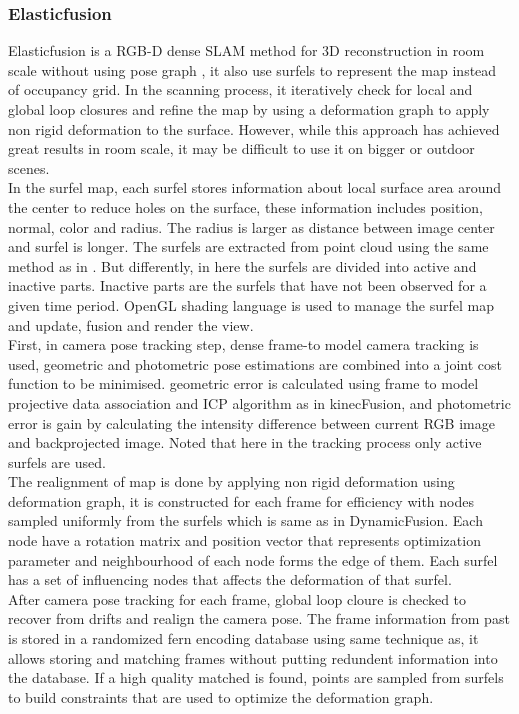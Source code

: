 \documentclass[12pt,twoside]{article}
\begin{document}
\subsubsection{Elasticfusion}
Elasticfusion\cite{whelan2015elasticfusion} is a RGB-D dense SLAM method for 3D reconstruction in room scale without using pose graph , it also use surfels to represent the map instead of occupancy grid. In the scanning process, it iteratively check for local and global loop closures and refine the map by using a deformation graph to apply non rigid deformation to the surface. However, while this approach has achieved great results in room scale, it may be difficult to use it on bigger or outdoor scenes.\\
In the surfel map, each surfel stores information about local surface area around the center to reduce holes on the surface, these information includes position, normal, color and radius. The radius is larger as distance between image center and surfel is longer. The surfels are extracted from point cloud using the same method as in \citep{keller2013real}. But differently, in here the surfels are divided into active and inactive parts. Inactive parts are the surfels that have not been observed for a given time period. OpenGL shading language is used to manage the surfel map and update, fusion and render the view. \\
First, in camera pose tracking step, dense frame-to model camera tracking is used, geometric and photometric pose estimations are combined into a joint cost function to be minimised. geometric error is calculated using frame to model projective data association and ICP algorithm as in kinecFusion\citep{newcombe2011kinectfusion}, and photometric error is gain by calculating the intensity difference between current RGB image and backprojected image. Noted that here in the tracking process only active surfels are used.\\
The realignment of map is done by applying non rigid deformation using deformation graph, it is constructed for each frame for efficiency with nodes sampled uniformly from the surfels which is same as in DynamicFusion\citep{newcombe2015dynamicfusion}. Each node have a rotation matrix and position vector that represents optimization parameter and neighbourhood of each node forms the edge of them. Each surfel has a set of influencing nodes that affects the deformation of that surfel.\\
After camera pose tracking for each frame, global loop cloure is checked to recover from drifts and realign the camera pose. The frame information from past is stored in a randomized fern encoding database using same technique as\cite{glocker2015real}, it allows storing and matching frames without putting redundent information into the database. If a high quality matched is found, points are sampled from surfels to build constraints that are used to optimize the deformation graph.\\
\end{document}

